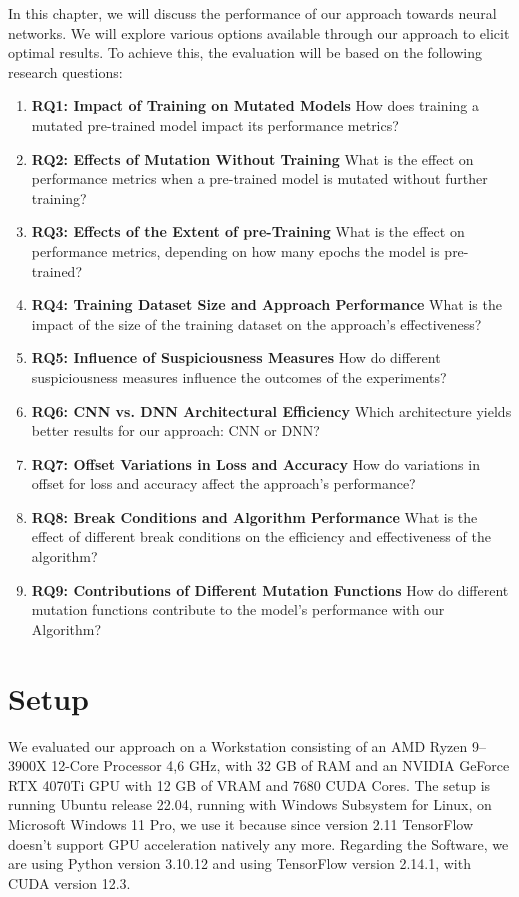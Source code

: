 In this chapter, we will discuss the performance of our approach towards neural networks.
We will explore various options available through our approach to elicit optimal results.
To achieve this, the evaluation will be based on the following research questions:
\begin{enumerate}
    \item[]\textbf{RQ1: Impact of Training on Mutated Models} How does training a mutated pre-trained model impact its performance metrics?
    \item[]\textbf{RQ2: Effects of Mutation Without Training} What is the effect on performance metrics when a pre-trained model is mutated without further training?
    \item[]\textbf{RQ3: Effects of the Extent of pre-Training} What is the effect on performance metrics, depending on how many epochs the model is pre-trained?
    \item[]\textbf{RQ4: Training Dataset Size and Approach Performance} What is the impact of the size of the training dataset on the approach's effectiveness?
    \item[]\textbf{RQ5: Influence of Suspiciousness Measures} How do different suspiciousness measures influence the outcomes of the experiments?
    \item[]\textbf{RQ6: CNN vs. DNN Architectural Efficiency} Which architecture yields better results for our approach: CNN or DNN?
    \item[]\textbf{RQ7: Offset Variations in Loss and Accuracy} How do variations in offset for loss and accuracy affect the approach's performance?
    \item[]\textbf{RQ8: Break Conditions and Algorithm Performance} What is the effect of different break conditions on the efficiency and effectiveness of the algorithm?
    \item[]\textbf{RQ9: Contributions of Different Mutation Functions} How do different mutation functions contribute to the model's performance with our Algorithm?
\end{enumerate}
\section{Setup}\label{sec:setup}

We evaluated our approach on a Workstation consisting of an AMD Ryzen 9--3900X 12-Core Processor 4,6 GHz, with 32 GB of RAM and an NVIDIA GeForce RTX 4070Ti GPU with 12 GB of VRAM and 7680 CUDA Cores.
The setup is running Ubuntu release 22.04, running with Windows Subsystem for Linux, on Microsoft Windows 11 Pro, we use it because since version 2.11\cite{noauthor_build_2023} TensorFlow doesn't support GPU acceleration natively any more.
Regarding the Software, we are using Python version 3.10.12 and using TensorFlow version 2.14.1, with CUDA version 12.3.

